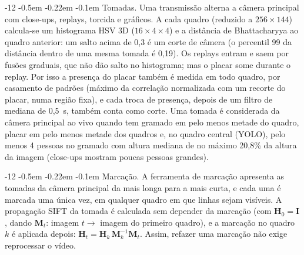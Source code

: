 \documentclass[12pt]{article}
\makeatletter
\renewcommand\paragraph{\@startsection{paragraph}{4}{\z@}%
                       {-12\p@ \@plus -4\p@ \@minus -4\p@}%
                       {-0.5em \@plus -0.22em \@minus -0.1em}%
                       {\normalfont\normalsize\itshape}}
\makeatother
\begin{document}
\paragraph{Tomadas.} Uma transmissão alterna a câmera principal com close-ups,
replays, torcida e gráficos. A cada quadro (reduzido a $256\times144$) calcula-se
um histograma HSV 3D ($16\times4\times4$) e a distância de Bhattacharyya ao quadro
anterior: um salto acima de 0,3 é um corte de câmera (o percentil 99 da distância
dentro de uma mesma tomada é 0,19). Os replays entram e saem por fusões graduais,
que não dão salto no histograma; mas o placar some durante o replay. Por isso a
presença do placar também é medida em todo quadro, por casamento de padrões
(máximo da correlação normalizada com um recorte do placar, numa região fixa), e
cada troca de presença, depois de um filtro de mediana de 0,5~s, também conta como
corte. Uma tomada é considerada da câmera principal ao vivo quando tem gramado em
pelo menos metade do quadro, placar em pelo menos metade dos quadros e, no quadro
central (YOLO), pelo menos 4 pessoas no gramado com altura mediana de no máximo
20,8\% da altura da imagem (close-ups mostram poucas pessoas grandes).

\paragraph{Marcação.} A ferramenta de marcação apresenta as tomadas da câmera
principal da mais longa para a mais curta, e cada uma é marcada uma única vez, em
qualquer quadro em que linhas sejam visíveis. A propagação SIFT da tomada é
calculada sem depender da marcação (com $\mathbf{H}_0 = \mathbf{I}$, dando
$\mathbf{M}_t$: imagem $t \rightarrow$ imagem do primeiro quadro), e a marcação no
quadro $k$ é aplicada depois: $\mathbf{H}_t = \mathbf{H}_k\,\mathbf{M}_k^{-1}\mathbf{M}_t$.
Assim, refazer uma marcação não exige reprocessar o vídeo.
\end{document}
